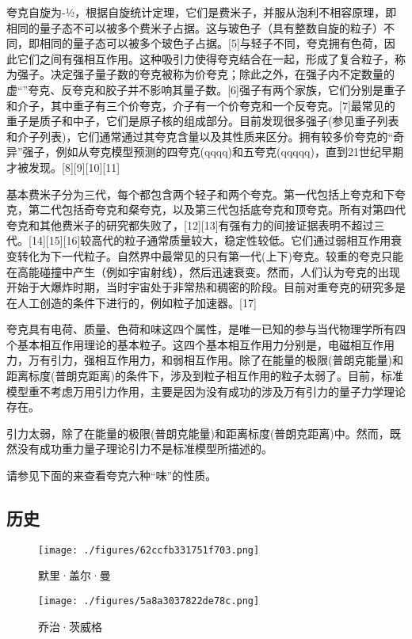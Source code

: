 夸克自旋为-1⁄2，根据自旋统计定理，它们是费米子，并服从泡利不相容原理，即相同的量子态不可以被多个费米子占据。这与玻色子（具有整数自旋的粒子）不同，即相同的量子态可以被多个玻色子占据。[5]与轻子不同，夸克拥有色荷，因此它们之间有强相互作用。这种吸引力使得夸克结合在一起，形成了复合粒子，称为强子。决定强子量子数的夸克被称为价夸克；除此之外，在强子内不定数量的虚“”夸克、反夸克和胶子并不影响其量子数。[6]强子有两个家族，它们分别是重子和介子，其中重子有三个价夸克，介子有一个价夸克和一个反夸克。[7]最常见的重子是质子和中子，它们是原子核的组成部分。目前发现很多强子(参见重子列表和介子列表)，它们通常通过其夸克含量以及其性质来区分。拥有较多价夸克的“奇异”强子，例如从夸克模型预测的四夸克(qqqq)和五夸克(qqqqq)，直到21世纪早期才被发现。[8][9][10][11]

基本费米子分为三代，每个都包含两个轻子和两个夸克。第一代包括上夸克和下夸克，第二代包括奇夸克和粲夸克，以及第三代包括底夸克和顶夸克。所有对第四代夸克和其他费米子的研究都失败了，[12][13]有强有力的间接证据表明不超过三代。[14][15][16]较高代的粒子通常质量较大，稳定性较低。它们通过弱相互作用衰变转化为下一代粒子。自然界中最常见的只有第一代(上下)夸克。较重的夸克只能在高能碰撞中产生（例如宇宙射线），然后迅速衰变。然而，人们认为夸克的出现开始于大爆炸时期，当时宇宙处于非常热和稠密的阶段。目前对重夸克的研究多是在人工创造的条件下进行的，例如粒子加速器。[17]

夸克具有电荷、质量、色荷和味这四个属性，是唯一已知的参与当代物理学所有四个基本相互作用理论的基本粒子。这四个基本相互作用力分别是，电磁相互作用力，万有引力，强相互作用力，和弱相互作用。除了在能量的极限(普朗克能量)和距离标度(普朗克距离)的条件下，涉及到粒子相互作用的粒子太弱了。目前，标准模型重不考虑万用引力作用，主要是因为没有成功的涉及万有引力的量子力学理论存在。

引力太弱，除了在能量的极限(普朗克能量)和距离标度(普朗克距离)中。然而，既然没有成功重力量子理论引力不是标准模型所描述的。

请参见下面的来查看夸克六种“味”的性质。

\subsection{历史}
\begin{figure}[ht]
\centering
\texttt{[image: ./figures/62ccfb331751f703.png]}
\caption{默里·盖尔·曼} \label{fig_Quark_2}
\end{figure}

\begin{figure}[ht]
\centering
\texttt{[image: ./figures/5a8a3037822de78c.png]}
\caption{乔治·茨威格} \label{fig_Quark_3}
\end{figure}

